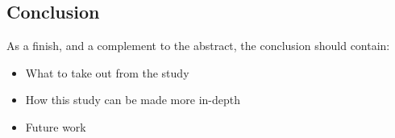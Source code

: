\documentclass[runningheads,a4paper,oribibl]{llncs}
\begin{document}
\subsection{Conclusion}
As a finish, and a complement to the abstract, the conclusion should contain:
\begin{itemize}
	\item What to take out from the study
	\item How this study can be made more in-depth
	\item Future work
\end{itemize}





\nocite{*}
% 



\end{document}
